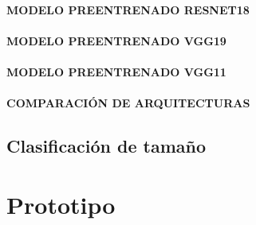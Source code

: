 			\subsubsection{\MakeUppercase{Modelo preentrenado RESNET18}}
			\subsubsection{\MakeUppercase{Modelo preentrenado VGG19}}
			\subsubsection{\MakeUppercase{Modelo preentrenado VGG11}}
			\subsubsection{\MakeUppercase{Comparación de arquitecturas}}
		
	\section{Clasificación de tamaño}
	
\chapter{Prototipo}
	

	















